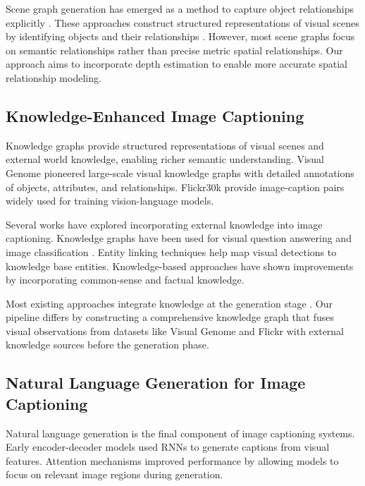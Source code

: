 \documentclass[runningheads,14pt]{llncs}
\begin{document}
Scene graph generation has emerged as a method to capture object relationships explicitly \cite{SceneGraphRef, yao2018exploring}. These approaches construct structured representations of visual scenes by identifying objects and their relationships \cite{zhong2020comprehensive}. However, most scene graphs focus on semantic relationships rather than precise metric spatial relationships. Our approach aims to incorporate depth estimation to enable more accurate spatial relationship modeling.

\subsection{Knowledge-Enhanced Image Captioning}

Knowledge graphs provide structured representations of visual scenes and external world knowledge, enabling richer semantic understanding. Visual Genome \cite{krishna2017visual} pioneered large-scale visual knowledge graphs with detailed annotations of objects, attributes, and relationships. Flickr30k \cite{young2014image} provide image-caption pairs widely used for training vision-language models.

Several works have explored incorporating external knowledge into image captioning. Knowledge graphs have been used for visual question answering \cite{KGforVQARef} and image classification \cite{marino2017ok}. Entity linking techniques \cite{EntityLinkingRef} help map visual detections to knowledge base entities. Knowledge-based approaches \cite{KnowledgeBasedCaptioningRef, zhao2021knowledge} have shown improvements by incorporating common-sense and factual knowledge.

Most existing approaches integrate knowledge at the generation stage \cite{wu2017image}. Our pipeline differs by constructing a comprehensive knowledge graph that fuses visual observations from datasets like Visual Genome and Flickr with external knowledge sources before the generation phase.

\subsection{Natural Language Generation for Image Captioning}

Natural language generation is the final component of image captioning systems. Early encoder-decoder models \cite{vinyals2015show, karpathy2015deep} used RNNs to generate captions from visual features. Attention mechanisms \cite{xu2015show, anderson2018bottom} improved performance by allowing models to focus on relevant image regions during generation.
\end{document}
